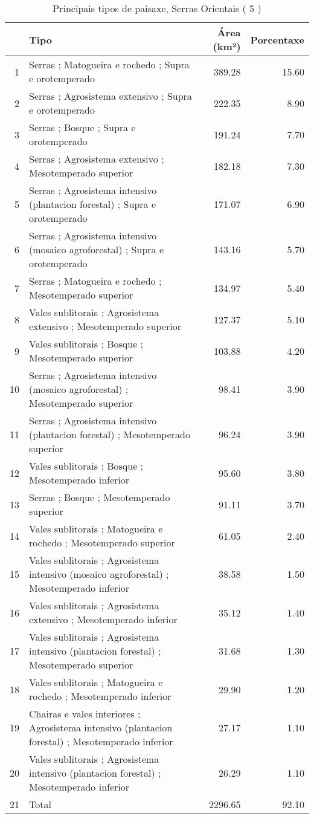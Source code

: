 \begin{table}[p]
\centering
\caption{Principais tipos de paisaxe,  Serras Orientais ( 5 )} 
\label{Tipos 5}
\begin{tabular}{rlrr}
  \hline
 & Tipo & Área (km²) & Porcentaxe \\ 
  \hline
1 & Serras ; Matogueira e rochedo ; Supra e orotemperado & 389.28 & 15.60 \\ 
  2 & Serras ; Agrosistema extensivo ; Supra e orotemperado & 222.35 & 8.90 \\ 
  3 & Serras ; Bosque ; Supra e orotemperado & 191.24 & 7.70 \\ 
  4 & Serras ; Agrosistema extensivo ; Mesotemperado superior & 182.18 & 7.30 \\ 
  5 & Serras ; Agrosistema intensivo (plantacion forestal) ; Supra e orotemperado & 171.07 & 6.90 \\ 
  6 & Serras ; Agrosistema intensivo (mosaico agroforestal) ; Supra e orotemperado & 143.16 & 5.70 \\ 
  7 & Serras ; Matogueira e rochedo ; Mesotemperado superior & 134.97 & 5.40 \\ 
  8 & Vales sublitorais ; Agrosistema extensivo ; Mesotemperado superior & 127.37 & 5.10 \\ 
  9 & Vales sublitorais ; Bosque ; Mesotemperado superior & 103.88 & 4.20 \\ 
  10 & Serras ; Agrosistema intensivo (mosaico agroforestal) ; Mesotemperado superior & 98.41 & 3.90 \\ 
  11 & Serras ; Agrosistema intensivo (plantacion forestal) ; Mesotemperado superior & 96.24 & 3.90 \\ 
  12 & Vales sublitorais ; Bosque ; Mesotemperado inferior & 95.60 & 3.80 \\ 
  13 & Serras ; Bosque ; Mesotemperado superior & 91.11 & 3.70 \\ 
  14 & Vales sublitorais ; Matogueira e rochedo ; Mesotemperado superior & 61.05 & 2.40 \\ 
  15 & Vales sublitorais ; Agrosistema intensivo (mosaico agroforestal) ; Mesotemperado inferior & 38.58 & 1.50 \\ 
  16 & Vales sublitorais ; Agrosistema extensivo ; Mesotemperado inferior & 35.12 & 1.40 \\ 
  17 & Vales sublitorais ; Agrosistema intensivo (plantacion forestal) ; Mesotemperado superior & 31.68 & 1.30 \\ 
  18 & Vales sublitorais ; Matogueira e rochedo ; Mesotemperado inferior & 29.90 & 1.20 \\ 
  19 & Chairas e vales interiores ; Agrosistema intensivo (plantacion forestal) ; Mesotemperado inferior & 27.17 & 1.10 \\ 
  20 & Vales sublitorais ; Agrosistema intensivo (plantacion forestal) ; Mesotemperado inferior & 26.29 & 1.10 \\ 
  21 & Total & 2296.65 & 92.10 \\ 
   \hline
\end{tabular}
\end{table}
